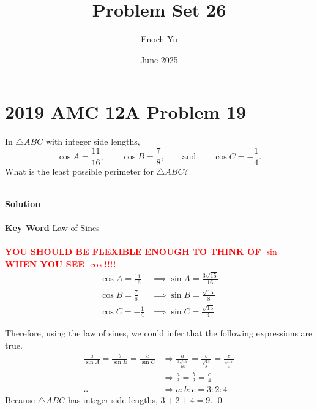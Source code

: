 \documentclass{article}
\title{Problem Set 26}
\author{Enoch Yu}
\date{June 2025}
\newenvironment{solution}{\begin{trivlist}\item[]{\bf Solution}}{\qed \end{trivlist}}
\begin{document}
\section*{2019 AMC 12A Problem 19}
In $\triangle{ABC}$ with integer side lengths,
\[
\cos A = \frac{11}{16}, \qquad \cos B = \frac{7}{8}, \qquad \text{and} \qquad \cos C = -\frac{1}{4}.
\]
What is the least possible perimeter for $\triangle{ABC}$?
\\\\
\begin{solution}
\\\\
\textbf{Key Word} Law of Sines
\\\\
\textcolor{red}{\textbf{YOU SHOULD BE FLEXIBLE ENOUGH TO THINK OF $\sin$ WHEN YOU SEE $\cos$!!!!}}
\begin{align*}
    \cos A = \frac{11}{16} &\implies \sin A = \frac{3\sqrt{15}}{16} \\
    \cos B = \frac{7}{8} &\implies \sin B = \frac{\sqrt{15}}{8} \\
    \cos C = -\frac{1}{4} &\implies \sin C = \frac{\sqrt{15}}{4}
\end{align*}
\begin{center}
\end{center}
Therefore, using the law of sines, we could infer that the following expressions are true.
\begin{align*}
    \frac{a}{\sin A} = \frac{b}{\sin B} = \frac{c}{\sin C}
    &\Rightarrow \frac{a}{\frac{3\sqrt{15}}{16}} = \frac{b}{\frac{\sqrt{15}}{8}} = \frac{c}{\frac{\sqrt{15}}{4}} \\
    &\Rightarrow \frac{a}{3} = \frac{b}{2} = \frac{c}{4} \\
    \therefore &\Rightarrow a : b : c = 3 : 2 : 4
\end{align*}
Because $\triangle{ABC}$ has integer side lengths, $3 + 2 + 4 = \boxed{9}$.
\end{solution}
\end{document}
